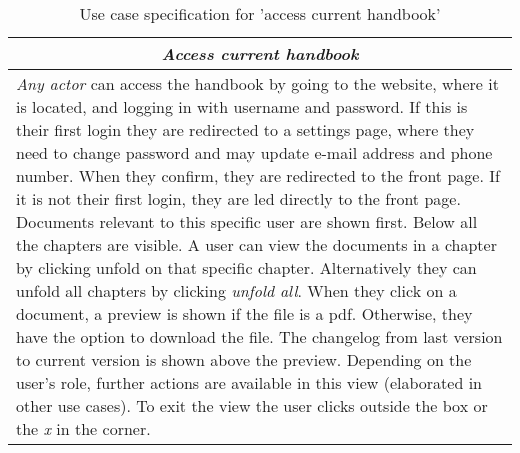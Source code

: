 \begin{table}
\centering
\begin{tabular}{p{12cm}}
\hline
\multicolumn{1}{c}{\textit{\textbf{Access current handbook}}} \\
\hline
\textit{Any actor} can access the handbook by going to the website, where it is located, and logging in with username and password.
If this is their first login they are redirected to a settings page, where they need to change password and may update e-mail address and phone number.
When they confirm, they are redirected to the front page.
If it is not their first login, they are led directly to the front page.
Documents relevant to this specific user are shown first.
Below all the chapters are visible.
A user can view the documents in a chapter by clicking unfold on that specific chapter.
Alternatively they can unfold all chapters by clicking \textit{unfold all}.
When they click on a document, a preview is shown if the file is a pdf.
Otherwise, they have the option to download the file.
The changelog from last version to current version is shown above the preview.
Depending on the user's role, further actions are available in this view (elaborated in other use cases).
To exit the view the user clicks outside the box or the \textit{x} in the corner.
\\\hline
\end{tabular}
\caption{Use case specification for 'access current handbook'}\label{tab:access-handbook}
\end{table}

